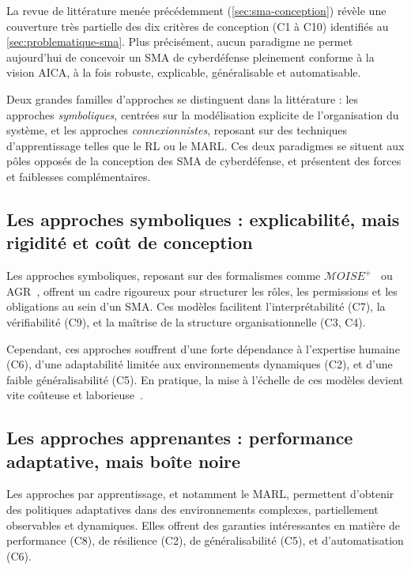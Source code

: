 La revue de littérature menée précédemment (\autoref{sec:sma-conception}) révèle une couverture très partielle des dix critères de conception (C1 à C10) identifiés au \autoref{sec:problematique-sma}. Plus précisément, aucun paradigme ne permet aujourd'hui de concevoir un \ac{SMA} de cyberdéfense pleinement conforme à la vision \ac{AICA}, à la fois robuste, explicable, généralisable et automatisable.

Deux grandes familles d'approches se distinguent dans la littérature : les approches \textit{symboliques}, centrées sur la modélisation explicite de l'organisation du système, et les approches \textit{connexionnistes}, reposant sur des techniques d'apprentissage telles que le \ac{RL} ou le \ac{MARL}. Ces deux paradigmes se situent aux pôles opposés de la conception des \ac{SMA} de cyberdéfense, et présentent des forces et faiblesses complémentaires.

\subsection{Les approches symboliques : explicabilité, mais rigidité et coût de conception}

Les approches symboliques, reposant sur des formalismes comme $\mathcal{M}OISE^+$~\cite{hubner2002moise} ou \ac{AGR}~\cite{Ferber2004}, offrent un cadre rigoureux pour structurer les rôles, les permissions et les obligations au sein d'un \ac{SMA}. Ces modèles facilitent l'interprétabilité (C7), la vérifiabilité (C9), et la maîtrise de la structure organisationnelle (C3, C4).

Cependant, ces approches souffrent d'une forte dépendance à l'expertise humaine (C6), d'une adaptabilité limitée aux environnements dynamiques (C2), et d'une faible généralisabilité (C5). En pratique, la mise à l'échelle de ces modèles devient vite coûteuse et laborieuse~\cite{Picard2006}.

\subsection{Les approches apprenantes : performance adaptative, mais boîte noire}

Les approches par apprentissage, et notamment le \ac{MARL}, permettent d'obtenir des politiques adaptatives dans des environnements complexes, partiellement observables et dynamiques. Elles offrent des garanties intéressantes en matière de performance (C8), de résilience (C2), de généralisabilité (C5), et d'automatisation (C6).

